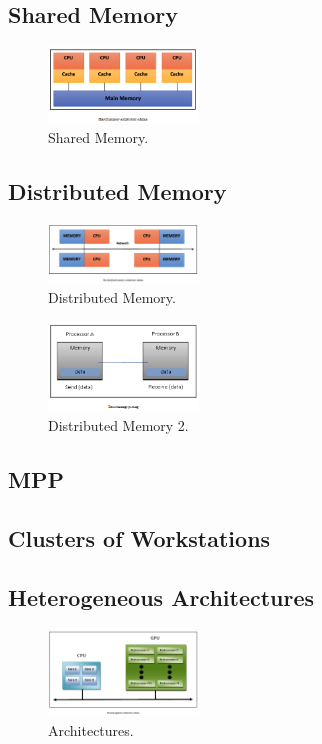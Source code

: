 \subsection{Shared Memory}

\begin{figure}[H]
	\includegraphics[width=4cm]{figures/kelompok2/chapter1/7.png}
	\centering
	\caption{Shared Memory.}
\end{figure}

\subsection{Distributed Memory}

\begin{figure}[H]
	\includegraphics[width=4cm]{figures/kelompok2/chapter1/8.png}
	\centering
	\caption{Distributed Memory.}
\end{figure}

\begin{figure}[H]
	\includegraphics[width=4cm]{figures/kelompok2/chapter1/9.png}
	\centering
	\caption{Distributed Memory 2.}
\end{figure}

\subsection{MPP}

\subsection{Clusters of Workstations}

\subsection{Heterogeneous Architectures}

\begin{figure}[H]
	\includegraphics[width=4cm]{figures/kelompok2/chapter1/10.png}
	\centering
	\caption{Architectures.}
\end{figure}